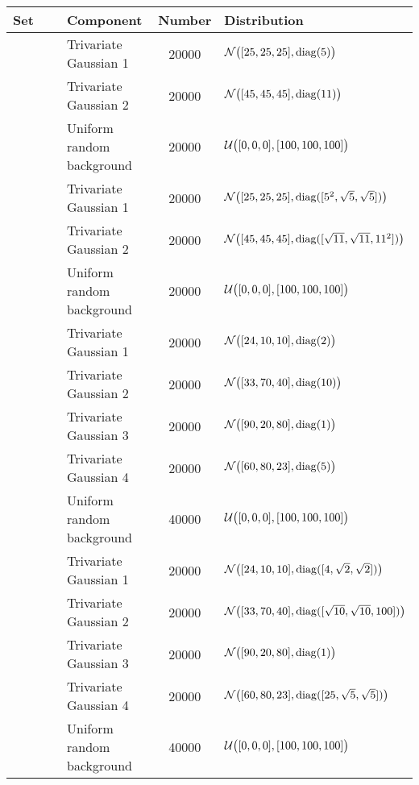 
\begin{tabular}{@{}cclS[table-format=+1.1e+1,scientific-notation=true,round-mode=places,round-precision=1]l@{}}
\toprule
Set 			&~						& Component					& {Number} 	& Distribution\\
\midrule
\hline
\ferdosiTwo 	&\legendComponentOne	& Trivariate Gaussian 1		& 20000		& $\mathcal{N}\big([25, 25, 25], \operatorname{diag}(5)\big)$\\
~ 				&\legendComponentTwo	& Trivariate Gaussian 2		& 20000		& $\mathcal{N}\big([45, 45, 45], \operatorname{diag}(11)\big)$\\
~ 				&\legendComponentNoise	& Uniform random background	& 20000		& $\mathcal{U}\big([0, 0, 0], [100, 100, 100]\big)$\\
\hline
\baakmanTwo		&\legendComponentOne	& Trivariate Gaussian 1		& 20000		& $\mathcal{N}\big([25, 25, 25], \operatorname{diag}([5^2, \sqrt{5}, \sqrt{5}])\big)$\\
~ 				&\legendComponentTwo	& Trivariate Gaussian 2		& 20000		& $\mathcal{N}\big([45, 45, 45], \operatorname{diag}([\sqrt{11}, \sqrt{11}, 11^2])\big)$\\
~ 				&\legendComponentNoise	& Uniform random background	& 20000		& $\mathcal{U}\big([0, 0, 0], [100, 100, 100]\big)$\\
\hline
\ferdosiThree	&\legendComponentOne 	& Trivariate Gaussian 1 	& 20000		& $\mathcal{N}\big([24, 10, 10], \operatorname{diag}(2)\big)$\\
~ 				&\legendComponentTwo	& Trivariate Gaussian 2 	& 20000		& $\mathcal{N}\big([33, 70, 40], \operatorname{diag}(10)\big)$\\
~ 				&\legendComponentThree	& Trivariate Gaussian 3 	& 20000		& $\mathcal{N}\big([90, 20, 80], \operatorname{diag}(1)\big)$\\
~ 				&\legendComponentFour	& Trivariate Gaussian 4 	& 20000		& $\mathcal{N}\big([60, 80, 23], \operatorname{diag}(5)\big)$\\
~ 				&\legendComponentNoise	& Uniform random background	& 40000		& $\mathcal{U}\big([0, 0, 0], [100, 100, 100]\big)$\\
\hline
\baakmanThree	&\legendComponentOne 	& Trivariate Gaussian 1 	& 20000		& $\mathcal{N}\big([24, 10, 10], \operatorname{diag}([4, \sqrt{2}, \sqrt{2}])\big)$\\
~ 				&\legendComponentTwo	& Trivariate Gaussian 2 	& 20000		& $\mathcal{N}\big([33, 70, 40], \operatorname{diag}([\sqrt{10}, \sqrt{10}, 100])\big)$\\
~ 				&\legendComponentThree	& Trivariate Gaussian 3 	& 20000		& $\mathcal{N}\big([90, 20, 80], \operatorname{diag}(1)\big)$\\
~ 				&\legendComponentFour	& Trivariate Gaussian 4 	& 20000		& $\mathcal{N}\big([60, 80, 23], \operatorname{diag}([25, \sqrt{5}, \sqrt{5}])\big)$\\
~ 				&\legendComponentNoise	& Uniform random background	& 40000		& $\mathcal{U}\big([0, 0, 0], [100, 100, 100]\big)$\\
\bottomrule
\end{tabular}